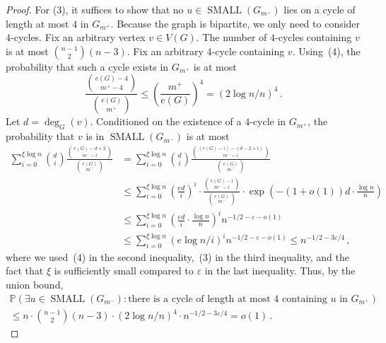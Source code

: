 \documentclass[reqno,final,a4paper]{amsart}
\numberwithin{equation}{section}
\theoremstyle{definition}
\theoremstyle{remark}
\renewcommand{\Pr}{\mathbb{P}}
\newcommand{\eps}{\varepsilon}
\newcommand{\SMA}{\operatorname{SMALL}}
\begin{document}
\begin{proof}
    For (3), it suffices to show that no $u\in \SMA(G_{m^-})$ lies on a cycle of length at most $4$ in $G_{m^+}$. 
    Because the graph is bipartite, we only need to consider $4$-cycles.
    Fix an arbitrary vertex $v\in V(G)$.   
     The number of $4$-cycles containing $v$ is at most $\binom{n-1}{2}(n-3)$.
     Fix an arbitrary $4$-cycle containing $v$. 
     Using~(4),
     the probability that such a cycle exists in $G_{m^+}$ is at most 
     $$\frac{\binom{e(G)-4}{m^+ -4}}{\binom{e(G)}{m^+}}\leq \left(\frac{m^+}{e(G)}\right)^4 = (2\log n/n)^4\,.$$
     Let $d = \deg_G(v)$.
     Conditioned on the existence of a $4$-cycle in $G_{m^+}$, the probability that $v$ is in $\SMA(G_{m^-})$ is at most 
     \begin{equation}\label{eqn:computation}
         \begin{split}
             \sum_{i=0}^{\xi\log n}\binom{d}{i} \frac{\binom{e(G)-d+2}{m^- - i}}{\binom{e(G)}{m^-}} &= \sum_{i=0}^{\xi\log n}\binom{d}{i}\frac{\binom{(e(G)-i)-(d-2+i)}{m^- - i}}{\binom{e(G)}{m^-}} \\
         &\leq \sum_{i=0}^{\xi\log n}\left(\frac{ed}{i}\right)^i\cdot \frac{\binom{e(G) -i}{m^- - i}}{\binom{e(G)}{m^-}}\cdot \exp\left(-(1+o(1))d\cdot \frac{\log n}{n}\right)\\
         &\leq \sum_{i=0}^{\xi\log n}\left(\frac{ed}{i}\cdot \frac{\log n}{n}\right)^i n^{-1/2-\eps -o(1)}\\
         &\leq \sum_{i=0}^{\xi\log n} (e\log n/i)^i  n^{-1/2-\eps -o(1)}\leq n^{-1/2 - 3\eps/4}\,,
         \end{split}
     \end{equation}
     where we used~(4) in the second inequality,~(3) in the third inequality, and the fact that $\xi$ is sufficiently small compared to $\eps$ in the last inequality.
    Thus, by the union bound,
         \begin{multline}\label{eqn:star}
            \Pr(\exists u\in \SMA(G_{m^-}): \text{there is a cycle of length at most $4$ containing $u$ in $G_{m^+}$}) \\
            \leq n\cdot \binom{n-1}{2} (n-3)\cdot (2\log n/n)^4 \cdot n^{-1/2-3\eps/4} = o(1)\,.
        \end{multline}


\end{proof}
\end{document}
